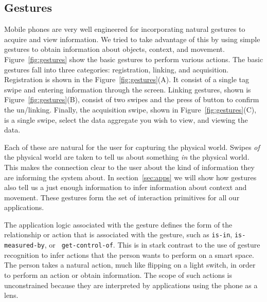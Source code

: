 \subsection{Gestures}
Mobile phones are very well engineered for incorporating natural gestures to acquire and view information.
We tried to take advantage of this by using simple gestures to obtain information about objects, context, and
movement.
Figure~\ref{fig:gestures} show the basic gestures to perform various actions.  The basic gestures fall into three
categories: registration, linking, and acquisition.  Registration is shown in the Figure~\ref{fig:gestures}(A).
It consist of a single tag swipe and entering information through the screen.  Linking gestures, 
shown is Figure~\ref{fig:gestures}(B), consist of
two swipes and the press of button to confirm the un/linking.  Finally, the acquisition swipe, shown
in Figure~\ref{fig:gestures}(C),  is a single swipe, select the data aggregate you wish to view, and viewing the data.

Each of these are natural for the user for capturing the physical world.  Swipes \emph{of}
the physical world are taken to tell us about something \emph{in} the physical world.  This makes the connection
clear to the user about the kind of information they are informing the system about.  In section~\ref{sec:apps}
we will show how gestures also tell us a just enough information to infer information about context and movement.
These gestures form the set of interaction primitives for all our
applications.  

The application logic associated with the gesture
defines the form of the relationship or action that is associated with the
gesture, such as {\tt is-in}, {\tt is-measured-by}, or {\tt
  get-control-of}.  This is in stark contrast to the use of gesture
recognition to infer actions that the person wants to perform on a
smart space.  The person takes a natural action, much like flipping on
a light switch, in order to perform an action or obtain information.
The scope of such actions is unconstrained because they are
interpreted by applications using the phone as a lens.

